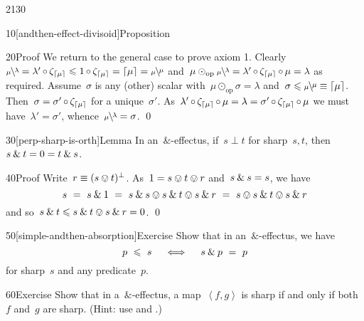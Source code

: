 \begin{parsec}{2130}
\begin{point}{10}[andthen-effect-divisoid]{Proposition}
\begin{point}{20}{Proof}
We return to the general case to prove axiom 1.
Clearly~$\rfrac{\lambda}{\mu} = \lambda' \after \zeta_{\ceil{\mu}}
            \leq 1 \after \zeta_{\ceil{\mu}} = \ceil{\mu} 
            = \rfrac{\mu}{\mu}$
    and~$\mu \odot_{\mathrm{op}} \rfrac{\lambda}{\mu}
= \lambda'  \after \zeta_{\ceil{\mu}} \after \mu = \lambda$
as required.
Assume~$\sigma$ is any
    (other) scalar with~$\mu \odot_{\mathrm{op}} \sigma = \lambda$
    and~$\sigma \leq \rfrac{\mu}{\mu} \equiv \ceil{\mu}$.
Then~$\sigma = \sigma' \mathop{\circ} \zeta_{\left\lceil\mu\right\rceil}$
    for a unique~$\sigma'$.
As~$
\lambda'  \mathop{\circ} \zeta_{\left\lceil\mu\right\rceil} \mathop{\circ} \mu = \lambda
= \sigma' \mathop{\circ} \zeta_{\left\lceil\mu\right\rceil} \mathop{\circ} \mu$
we must have~$\lambda' = \sigma'$, whence~$\rfrac{\lambda}{\mu}=\sigma$. \qed
\end{point}
\end{point}
\begin{point}{30}[perp-sharp-is-orth]{Lemma}%
In an~$\&$-effectus, if~$s \perp t$
    for sharp~$s,t$, then~$s \mathbin{\&} t = 0 = t \mathbin{\&} s$.
\begin{point}{40}{Proof}%
Write~$r \equiv (s \ovee t)^\perp$.
    As~$1 = s \ovee t \ovee r$ and~$s \mathbin{\&} s=s$, we have
\begin{equation*}
    s \ = \ 
    \andthen{s}{1} \ = \ 
    \andthen{s}{s} \ovee \andthen{s}{t} \ovee \andthen{s}{r} \ = \ 
    s \ovee \andthen{s}{t} \ovee \andthen{s}{r}
\end{equation*}
and so~$s \mathbin{\&} t \leqslant s \mathbin{\&} t \ovee s \mathbin{\&} r = 0$. \qed
\end{point}
\end{point}
\begin{point}{50}[simple-andthen-absorption]{Exercise}%
Show that in an~$\&$-effectus, we have
\begin{equation*}
p \ \leqslant\  s \quad \iff \quad s \mathbin{\&} p \ =\  p
\end{equation*}
for sharp~$s$ and any predicate~$p$.
\end{point}
\begin{point}{60}{Exercise}%
Show that in a~$\&$-effectus,
    a map~$\left<f,g\right>$
    is sharp if and only if both~$f$ and~$g$ are sharp.
    (Hint: use  and .)
\end{point}
\end{parsec}

